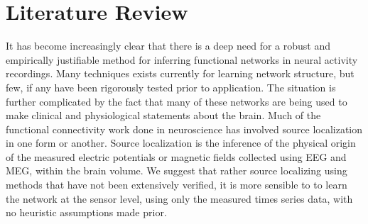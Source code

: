 \documentclass[11pt]{article}
\begin{document}
\section{Literature Review}
It has become increasingly clear that there is a deep need for a robust and empirically justifiable method for inferring functional networks in neural activity recordings. Many techniques exists currently for learning network structure, but few, if any have been rigorously tested prior to application. The situation is further complicated by the fact that many of these networks are being used to make clinical and physiological statements about the brain. Much of the functional connectivity work done in neuroscience has involved source localization in one form or another. Source localization is the inference of the physical origin of the measured electric potentials or magnetic fields collected using EEG and MEG, within the brain volume. We suggest that rather source localizing using methods that have not been extensively verified, it is more sensible to to learn the network at the sensor level, using only the measured times series data, with no heuristic assumptions made prior. 
\end{document}
